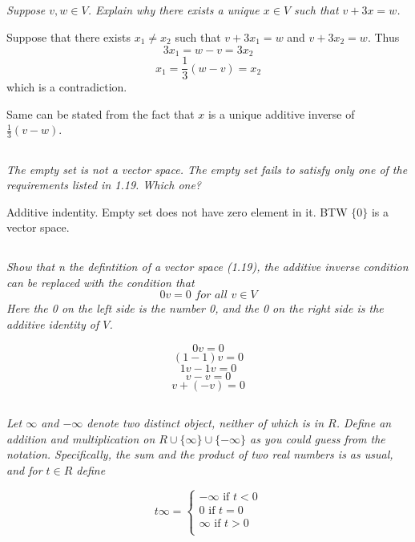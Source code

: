 \documentclass[10pt,oneside,titlepage]{book}
\begin{document}
\subsection{}
\textit{Suppose $v, w \in V$. Explain why there exists a unique $x \in V$
  such that $v + 3x = w$.}

Suppose that there exists $x_1 \neq x_2$ such that
$v + 3x_1 = w$ and $v + 3x_2 = w$. Thus
$$3x_1 = w - v = 3x_2$$
$$x_1 = \frac{1}{3}(w - v) = x_2$$
which is a contradiction.

Same can be stated from the fact that $x$ is a unique additive inverse of
$\frac{1}{3}(v - w)$.

\subsection{}
\textit{The empty set is not a vector space. The empty set fails to satisfy
  only one of the requirements listed in 1.19. Which one?}

Additive indentity. Empty set does not have zero element in it.
BTW $\{0\}$ is a vector space.

\subsection{}
\textit{Show that n the defintition of a vector space (1.19), the additive
  inverse condition can be replaced with the condition that}
$$0v = 0 \textit{ for all } v \in V$$
\textit{Here the 0 on the left side is the number 0, and the 0 on the right
  side is the additive identity of $V$.}

$$0v = 0$$
$$(1 - 1)v = 0$$
$$1v - 1v = 0$$
$$v - v= 0$$
$$v + (- v)= 0$$

\subsection{}
\textit{Let $\infty$ and $-\infty$ denote two distinct object, neither of
  which is in $R$. Define an addition and multiplication on
  $R \cup \{\infty\} \cup \{-\infty\}$ as you could guess from the notation.
  Specifically, the sum and the product of two real numbers is as usual,
  and for $t \in R$ define
}

$$
t\infty =
\begin{cases}
  -\infty \text{ if } t < 0 \\
  0 \text{ if } t = 0 \\
  \infty \text{ if } t > 0 \\
\end{cases}
$$
\end{document}
